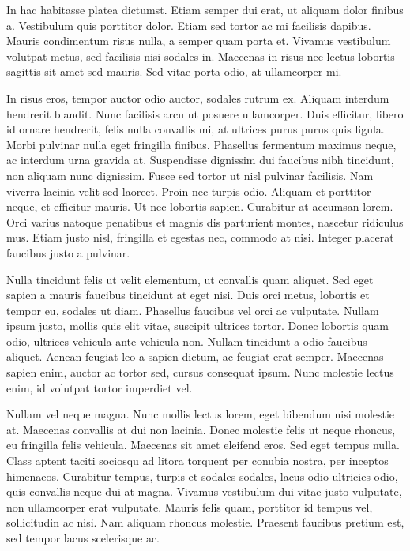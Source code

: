 In hac habitasse platea dictumst. Etiam semper dui erat, ut aliquam dolor finibus a. Vestibulum quis porttitor dolor. Etiam sed tortor ac mi facilisis dapibus. Mauris condimentum risus nulla, a semper quam porta et. Vivamus vestibulum volutpat metus, sed facilisis nisi sodales in. Maecenas in risus nec lectus lobortis sagittis sit amet sed mauris. Sed vitae porta odio, at ullamcorper mi.

In risus eros, tempor auctor odio auctor, sodales rutrum ex. Aliquam interdum hendrerit blandit. Nunc facilisis arcu ut posuere ullamcorper. Duis efficitur, libero id ornare hendrerit, felis nulla convallis mi, at ultrices purus purus quis ligula. Morbi pulvinar nulla eget fringilla finibus. Phasellus fermentum maximus neque, ac interdum urna gravida at. Suspendisse dignissim dui faucibus nibh tincidunt, non aliquam nunc dignissim. Fusce sed tortor ut nisl pulvinar facilisis. Nam viverra lacinia velit sed laoreet. Proin nec turpis odio. Aliquam et porttitor neque, et efficitur mauris. Ut nec lobortis sapien. Curabitur at accumsan lorem. Orci varius natoque penatibus et magnis dis parturient montes, nascetur ridiculus mus. Etiam justo nisl, fringilla et egestas nec, commodo at nisi. Integer placerat faucibus justo a pulvinar.

Nulla tincidunt felis ut velit elementum, ut convallis quam aliquet. Sed eget sapien a mauris faucibus tincidunt at eget nisi. Duis orci metus, lobortis et tempor eu, sodales ut diam. Phasellus faucibus vel orci ac vulputate. Nullam ipsum justo, mollis quis elit vitae, suscipit ultrices tortor. Donec lobortis quam odio, ultrices vehicula ante vehicula non. Nullam tincidunt a odio faucibus aliquet. Aenean feugiat leo a sapien dictum, ac feugiat erat semper. Maecenas sapien enim, auctor ac tortor sed, cursus consequat ipsum. Nunc molestie lectus enim, id volutpat tortor imperdiet vel.

Nullam vel neque magna. Nunc mollis lectus lorem, eget bibendum nisi molestie at. Maecenas convallis at dui non lacinia. Donec molestie felis ut neque rhoncus, eu fringilla felis vehicula. Maecenas sit amet eleifend eros. Sed eget tempus nulla. Class aptent taciti sociosqu ad litora torquent per conubia nostra, per inceptos himenaeos. Curabitur tempus, turpis et sodales sodales, lacus odio ultricies odio, quis convallis neque dui at magna. Vivamus vestibulum dui vitae justo vulputate, non ullamcorper erat vulputate. Mauris felis quam, porttitor id tempus vel, sollicitudin ac nisi. Nam aliquam rhoncus molestie. Praesent faucibus pretium est, sed tempor lacus scelerisque ac.

